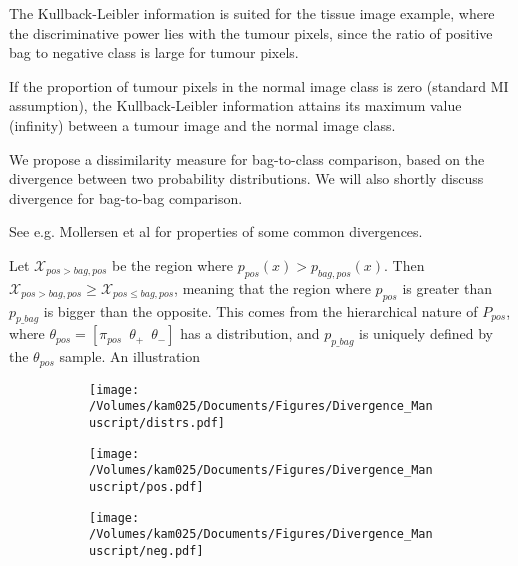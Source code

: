 The Kullback-Leibler information is suited for the tissue image example, where the discriminative power lies with the tumour pixels, since the ratio of positive bag to negative class is large for tumour pixels. 

If the proportion of tumour pixels in the normal image class is zero (standard MI assumption), the Kullback-Leibler information attains its maximum value (infinity) between a tumour image and the normal image class. 


We propose a dissimilarity measure for bag-to-class comparison, based on the divergence between two probability distributions. 
We will also shortly discuss divergence for bag-to-bag comparison. 





See e.g. {\color{green} Mollersen et al} for properties of some common divergences. 



Let $\mathcal{X}_{pos>{bag,pos}}$ be the region where $p_{pos}(x)>p_{bag,pos}(x)$. 
Then $\mathcal{X}_{pos>{bag,pos}} \geq \mathcal{X}_{pos \leq {bag,pos}}$, 
meaning that the region where $p_{pos}$ is greater than $p_{p\_ bag}$ is bigger than the opposite. 
This comes from the hierarchical nature of $P_{pos}$, where $\theta_{pos} = [\pi_{pos} \,\,\,\theta_+ \,\,\,\theta_-]$ has a distribution, and $p_{p\_ bag}$ is uniquely defined by the $\theta_{pos}$ sample. 
An illustration
\begin{figure}[!h]
  \centering
  \begin{subfigure}{}
    \texttt{[image: /Volumes/kam025/Documents/Figures/Divergence\_Manuscript/distrs.pdf]}
  \end{subfigure}    
  \begin{subfigure}{}
    \texttt{[image: /Volumes/kam025/Documents/Figures/Divergence\_Manuscript/pos.pdf]}
  \end{subfigure}
  \begin{subfigure}{}
    \texttt{[image: /Volumes/kam025/Documents/Figures/Divergence\_Manuscript/neg.pdf]}
  \end{subfigure}
\end{figure}


